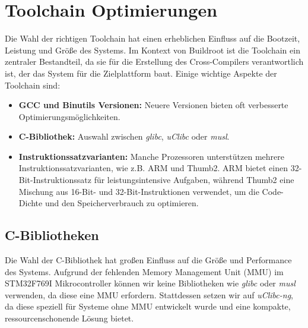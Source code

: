 
\section{Toolchain Optimierungen}
Die Wahl der richtigen Toolchain hat einen erheblichen Einfluss auf die Bootzeit, Leistung und Größe des Systems. Im Kontext von Buildroot ist die Toolchain ein zentraler Bestandteil, da sie für die Erstellung des Cross-Compilers verantwortlich ist, der das System für die Zielplattform baut. Einige wichtige Aspekte der Toolchain sind:

\begin{itemize}
	\item \textbf{GCC und Binutils Versionen:} Neuere Versionen bieten oft verbesserte Optimierungsmöglichkeiten.
	\item \textbf{C-Bibliothek:} Auswahl zwischen \textit{glibc}, \textit{uClibc} oder \textit{musl}.
	\item \textbf{Instruktionssatzvarianten:} Manche Prozessoren unterstützen mehrere Instruktionssatzvarianten, wie z.B. ARM und Thumb2. ARM bietet einen 32-Bit-Instruktionssatz für leistungsintensive Aufgaben, während Thumb2 eine Mischung aus 16-Bit- und 32-Bit-Instruktionen verwendet, um die Code-Dichte und den Speicherverbrauch zu optimieren.
\end{itemize}

\subsection{C-Bibliotheken}
Die Wahl der C-Bibliothek hat großen Einfluss auf die Größe und Performance des Systems. Aufgrund der fehlenden Memory Management Unit (MMU) im STM32F769I Mikrocontroller können wir keine Bibliotheken wie \textit{glibc} oder \textit{musl} verwenden, da diese eine MMU erfordern. Stattdessen setzen wir auf \textit{uClibc-ng}, da diese speziell für Systeme ohne MMU entwickelt wurde und eine kompakte, ressourcenschonende Lösung bietet.
